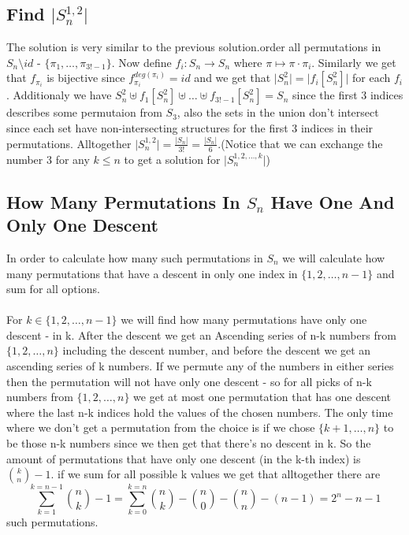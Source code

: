 \documentclass{article}
\begin{document}
\subsection{Find $\vert S^{1,2}_n \vert$}
The solution is very similar to the previous solution.order all permutations in $S_n \setminus {id}$ - $\{\pi_1, \dots , \pi_{3!-1}\}$. Now define $f_i: S_n \to S_n$ where $\pi \mapsto \pi \cdot {\pi}_i$. Similarly we get that $f_{\pi_i}$ is bijective since $f^{deg(\pi_i)}_{\pi_i} = id$ and we get that $\vert S^2_n\vert = \vert f_i{[S^2_n]} \vert$ for each $f_i$. Additionaly we have $S^2_n \uplus f_1{[S^2_n]} \uplus \dots \uplus f_{3!-1}{[S^2_n]} = S_n$ since the first 3 indices describes some permutaion from $S_3$, also the sets in the union don't intersect since each set have non-intersecting structures for the first 3 indices in their permutations. Alltogether $\vert S^{1,2}_n \vert = \frac{\vert S_n \vert}{3!}= \frac{\vert S_n\vert }{6}$.(Notice that we can exchange the number 3 for any $k \leq n$ to get a solution for $ \vert S^{1,2,\dots,k}_n \vert$)
\subsection{How Many Permutations In $S_n$ Have One And Only One Descent}
In order to calculate how many such permutations in $S_n$ we will calculate how many permutations that have a descent in only one index in $\{1,2,\dots,n-1\}$ and sum for all options.
\\
\\
For $k \in \{1,2, \dots, n-1\}$ we will find how many permutations have only one descent - in k. After the descent we get an Ascending series of n-k numbers from $\{1,2,\dots, n\}$ including the descent number, and before the descent we get an ascending series of k numbers. If we permute any of the numbers in either series then the permutation will not have only one descent - so for all picks of n-k numbers from $\{1,2,\dots,n\}$ we get at most one permutation that has one descent where the last n-k indices hold the values of the chosen numbers. The only time where we don't get a permutation from the choice is if we chose $\{k+1,\dots,n\}$
to be those n-k numbers since we then get that there's no descent in k. So the amount of permutations that have only one descent (in the k-th index) is ${k\choose n}-1$. if we sum for all possible k values we get that alltogether there are $$\sum_{k=1}^{k=n-1}{n\choose k}-1 = \sum_{k=0}^{k=n}{n\choose k}-{n\choose 0}-{n\choose n} - (n-1) = 2^n -n -1$$ such permutations. 
\end{document}
